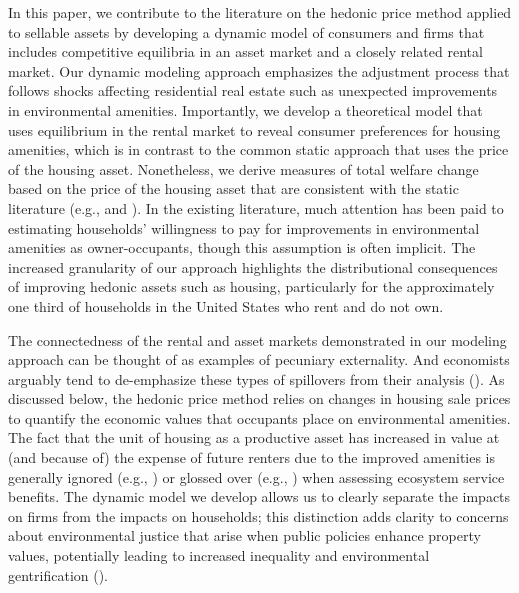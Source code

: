 \documentclass[ecta,nameyear,draft]{econsocart}
\theoremstyle{plain}
\theoremstyle{remark}
\begin{document}
In this paper, we contribute to the literature on the hedonic price method applied to sellable assets by developing a dynamic model of consumers and firms that includes competitive equilibria in an asset market and a closely related rental market. Our dynamic modeling approach emphasizes the adjustment process that follows shocks affecting residential real estate such as unexpected improvements in environmental amenities. Importantly, we develop a theoretical model that uses equilibrium in the rental market to reveal consumer preferences for housing amenities, which is in contrast to the common static approach that uses the price of the housing asset. Nonetheless, we derive measures of total welfare change based on the price of the housing asset that are consistent with the static literature (e.g., \cite{freeman99} and \cite{freeman14}). In the existing literature, much attention has been paid to estimating households' willingness to pay for improvements in environmental amenities as owner-occupants, though this assumption is often implicit. The increased granularity of our approach highlights the distributional consequences of improving hedonic assets such as housing, particularly for the approximately one third of households in the United States who rent and do not own. 

The connectedness of the rental and asset markets demonstrated in our modeling approach can be thought of as examples of pecuniary externality. And economists arguably tend to de-emphasize these types of spillovers from their analysis (\cite{holcombe01}). As discussed below, the hedonic price method relies on changes in housing sale prices to quantify the economic values that occupants place on environmental amenities. The fact that the unit of housing as a productive asset has increased in value at (and because of) the expense of future renters due to the improved amenities is generally ignored (e.g., \cite{bishop20}) or glossed over (e.g., \cite{banzhaf20}) when assessing ecosystem service benefits. The dynamic model we develop allows us to clearly separate the impacts on firms from the impacts on households; this distinction adds clarity to concerns about environmental justice that arise when public policies enhance property values, potentially leading to increased inequality and environmental gentrification (\cite{banzhafJustice19}). 
\end{document}
